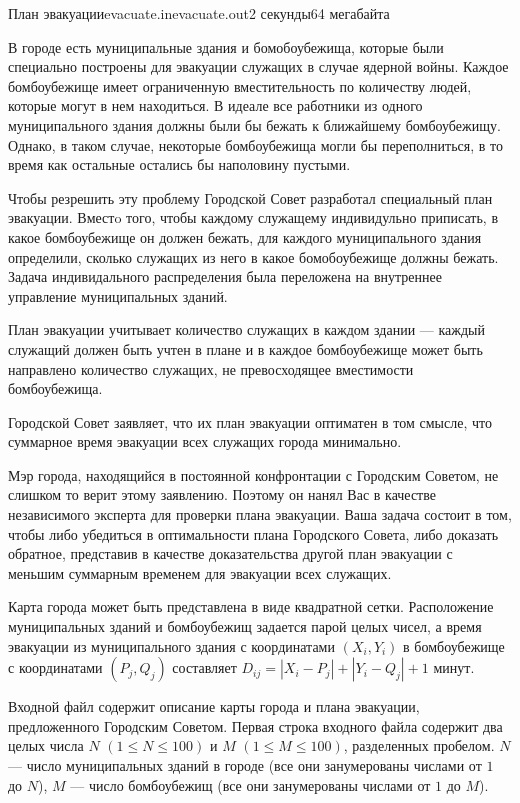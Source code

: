 \begin{problem}{План эвакуации}{evacuate.in}{evacuate.out}{2 секунды}{64 мегабайта}

В городе есть муниципальные здания и бомобоубежища, которые были специально построены
для эвакуации служащих в случае ядерной войны. Каждое бомбоубежище имеет ограниченную
вместительность по количеству людей, которые могут в нем находиться. В идеале все 
работники из одного муниципального здания должны были бы бежать к ближайшему 
бомбоубежищу. Однако, в таком случае, некоторые бомбоубежища могли бы переполниться,
в то время как остальные остались бы наполовину пустыми.

Чтобы резрешить эту проблему Городской Совет разработал специальный план эвакуации.
Вместo того, чтобы каждому служащему индивидульно приписать, в какое бомбоубежище
он должен бежать, для каждого муниципального здания определили, сколько служащих из него
в какое бомобоубежище должны бежать. Задача индивидального распределения была переложена
на внутреннее управление муниципальных зданий.

План эвакуации учитывает количество служащих в каждом здании --- каждый служащий должен
быть учтен в плане и в каждое бомбоубежище может быть направлено количество служащих, не
превосходящее вместимости бомбоубежища.

Городской Совет заявляет, что их план эвакуации оптиматен в том смысле, что суммарное 
время эвакуации всех служащих города минимально.

Мэр города, находящийся в постоянной конфронтации с Городским Советом, не слишком то верит
этому заявлению. Поэтому он нанял Вас в качестве независимого эксперта для проверки плана
эвакуации. Ваша задача состоит в том, чтобы либо убедиться в оптимальности плана Городского
Совета, либо доказать обратное, представив в качестве доказательства другой план эвакуации
с меньшим суммарным временем для эвакуации всех служащих.

Карта города может быть представлена в виде квадратной сетки. Расположение муниципальных
зданий и бомбоубежищ задается парой целых чисел, а время эвакуации из муниципального здания
с координатами $(X_i, Y_i)$ в бомбоубежище с координатами $(P_j, Q_j)$ составляет 
$D_{ij} = |X_i - P_j| + |Y_i - Q_j| + 1$ минут.

\InputFile

Входной файл содержит описание карты города и плана эвакуации, предложенного Городским Советом.
Первая строка входного файла содержит два целых числа $N$ $(1 \le N \le 100)$ и $M$ $(1 \le M \le 100)$, 
разделенных пробелом. $N$ --- число муниципальных зданий в городе (все они занумерованы числами от $1$ до $N$), 
$M$ --- число бомбоубежищ (все они занумерованы числами от $1$ до $M$).


\end{problem}
